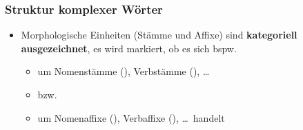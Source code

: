 \begin{frame}
\frametitle{Struktur komplexer Wörter}

\begin{minipage}{0.65\textwidth}
\begin{itemize}
	\item Morphologische Einheiten (Stämme und Affixe) sind \textbf{kategoriell ausgezeichnet}, \dash es wird markiert, ob es sich bspw. 
	
	\begin{itemize}
		\item um Nomenstämme (), Verbstämme (), \ldots 
		\item[] bzw.
		\item um Nomenaffixe (), Verbaffixe (), \ldots\  handelt
	\end{itemize}
\end{itemize}
\end{minipage}
%
\hfill%
%
\begin{minipage}{.34\textwidth}

\begin{figure}	
\centering
{}

\vspace{.5cm}

\centering
{}
\end{figure}
\end{minipage}
\end{frame}


